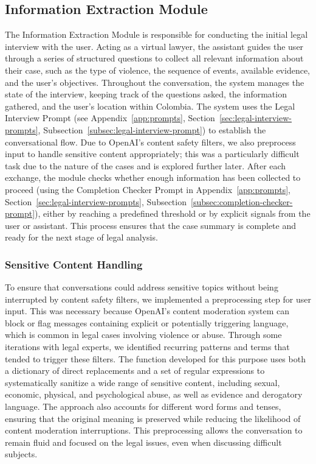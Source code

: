 \subsection{Information Extraction Module}
The Information Extraction Module is responsible for conducting the initial legal interview with the user. 
Acting as a virtual lawyer, the assistant guides the user through a series of structured questions to collect 
all relevant information about their case, such as the type of violence, the sequence of events, available evidence, 
and the user's objectives. Throughout the conversation, the system manages the state of the interview, keeping track of 
the questions asked, the information gathered, and the user's location within Colombia. The system uses the Legal Interview Prompt 
(see Appendix~\ref{app:prompts}, Section~\ref{sec:legal-interview-prompts}, Subsection~\ref{subsec:legal-interview-prompt}) 
to establish the conversational flow. Due to OpenAI's content safety filters, 
we also preprocess input to handle sensitive content appropriately; this was a particularly difficult task due to the nature 
of the cases and is explored further later. 
After each exchange, the module checks whether enough information has been collected to proceed 
(using the Completion Checker Prompt in Appendix~\ref{app:prompts}, Section~\ref{sec:legal-interview-prompts}, 
Subsection~\ref{subsec:completion-checker-prompt}), either by reaching a predefined threshold or 
by explicit signals from the user or assistant. This process ensures that the case summary is complete and ready for the next stage of legal analysis.
\subsubsection{Sensitive Content Handling}
To ensure that conversations could address sensitive topics without being interrupted by content safety filters, 
we implemented a preprocessing step for user input. This was necessary because OpenAI's content moderation system 
can block or flag messages containing explicit or potentially triggering language, which is common in legal cases 
involving violence or abuse. Through some iterations with legal experts, we identified recurring patterns and terms 
that tended to trigger these filters. The function developed for this purpose uses both a dictionary of direct replacements 
and a set of regular expressions to systematically sanitize a wide range of sensitive content, including sexual, economic, 
physical, and psychological abuse, as well as evidence and derogatory language. The approach also accounts for different word 
forms and tenses, ensuring that the original meaning is preserved while reducing the likelihood of content moderation 
interruptions. This preprocessing allows the conversation to remain fluid and focused on the legal issues, 
even when discussing difficult subjects.

